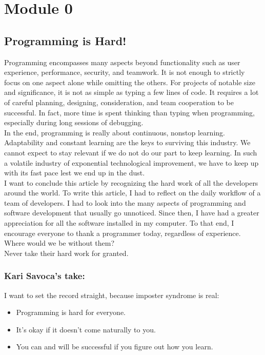 \documentclass{article}
\begin{document}
\section{Module 0}

\subsection{Programming is Hard!}

Programming encompasses many aspects beyond functionality such as user experience, performance, security, and teamwork. It is not enough to strictly focus on one aspect alone while omitting the others. For projects of notable size and significance, it is not as simple as typing a few lines of code. It requires a lot of careful planning, designing, consideration, and team cooperation to be successful. In fact, more time is spent thinking than typing when programming, especially during long sessions of debugging.
\\
In the end, programming is really about continuous, nonstop learning. Adaptability and constant learning are the keys to surviving this industry. We cannot expect to stay relevant if we do not do our part to keep learning. In such a volatile industry of exponential technological improvement, we have to keep up with its fast pace lest we end up in the dust.
\\
I want to conclude this article by recognizing the hard work of all the developers around the world. To write this article, I had to reflect on the daily workflow of a team of developers. I had to look into the many aspects of programming and software development that usually go unnoticed. Since then, I have had a greater appreciation for all the software installed in my computer. To that end, I encourage everyone to thank a programmer today, regardless of experience. Where would we be without them?
\\
Never take their hard work for granted.
\\

\subsubsection{Kari Savoca's take:}

I want to set the record straight, because imposter syndrome is real:
\begin{itemize}
	\item Programming is hard for everyone.
	\item It’s okay if it doesn’t come naturally to you.
	\item You can and will be successful if you figure out how you learn.
\end{itemize}
\end{document}
